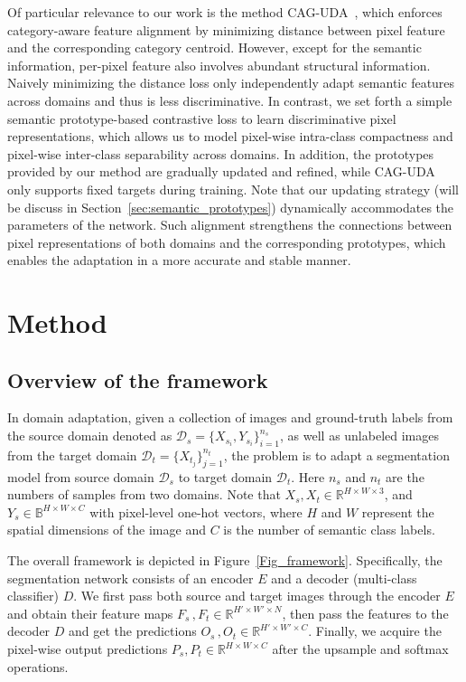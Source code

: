\documentclass[runningheads]{llncs}
\newcommand{\Rb}{\mathbb{R}}
\newcommand{\Dm}{\mathcal{D}}
\begin{document}
Of particular relevance to our work is the method CAG-UDA~\cite{zhang2019category}, which enforces category-aware feature alignment by minimizing distance between pixel feature and the corresponding category centroid. 
However, except for the semantic information, per-pixel feature also involves abundant structural information. Naively minimizing the distance loss only independently adapt semantic features across domains and thus is less discriminative. 
In contrast, we set forth a simple semantic prototype-based contrastive loss to learn discriminative pixel representations, which allows us to model pixel-wise intra-class compactness and pixel-wise inter-class separability across domains. 
In addition, the prototypes provided by our method are gradually updated and refined, while CAG-UDA only supports fixed targets during training. Note that our updating strategy (will be discuss in Section~\ref{sec:semantic_prototypes}) dynamically accommodates the parameters of the network.
Such alignment strengthens the connections between pixel representations of both domains and the corresponding prototypes, which enables the adaptation in a more accurate and stable manner.



\section{Method}\label{sec:method}

\subsection{Overview of the framework}
In domain adaptation, given a collection of images and ground-truth labels from the source domain denoted as $\Dm_s=\{X_{s_i}, Y_{s_i}\}_{i=1}^{n_s}$, as well as unlabeled images from the target domain $\Dm_t=\{X_{t_j}\}_{j=1}^{n_t}$, the problem is to adapt a segmentation model from source domain $\Dm_s$ to target domain $\Dm_t$. Here $n_s$ and $n_t$ are the numbers of samples from two domains. Note that $X_s, X_t \in \Rb^{H\times W\times 3}$, and $Y_s \in \mathbb{B}^{H\times W\times C}$ with pixel-level one-hot vectors, where $H$ and $W$ represent the spatial dimensions of the image and $C$ is the number of semantic class labels. 

The overall framework is depicted in Figure~\ref{Fig_framework}.
Specifically, the segmentation network consists of an encoder $E$ and a decoder (multi-class classifier) $D$. 
We first pass both source and target images through the encoder $E$ and obtain their feature maps $F_s\,,F_t \in \Rb^{H'\times W'\times N}$, then pass the features to the decoder $D$ and get the predictions $O_s\,,O_t \in \Rb^{H'\times W' \times C}$. Finally, we acquire the pixel-wise output predictions $P_s, P_t \in \Rb^{H\times W\times C}$ after the upsample and softmax operations. 
\end{document}
